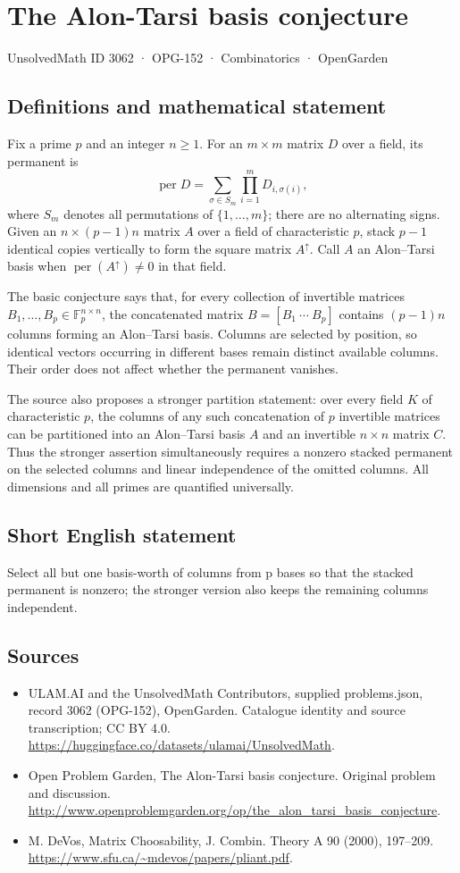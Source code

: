 \documentclass[11pt,a4paper]{article}
\begin{document}
\section*{The Alon-Tarsi basis conjecture}\label{3062}
{\small UnsolvedMath ID 3062 · OPG-152 · Combinatorics · OpenGarden}
\subsection{Definitions and mathematical statement}
Fix a prime $p$ and an integer $n\ge1$. For an $m\times m$ matrix $D$ over a field, its permanent is
\[
 \operatorname{per}D=\sum_{\sigma\in S_m}\prod_{i=1}^mD_{i,\sigma(i)},
\]
where $S_m$ denotes all permutations of $\{1,\ldots,m\}$; there are no alternating signs. Given an $n\times(p-1)n$ matrix $A$ over a field of characteristic $p$, stack $p-1$ identical copies vertically to form the square matrix $A^{\uparrow}$. Call $A$ an Alon--Tarsi basis when $\operatorname{per}(A^{\uparrow})\ne0$ in that field.

The basic conjecture says that, for every collection of invertible matrices $B_1,\ldots,B_p\in\mathbb F_p^{n\times n}$, the concatenated matrix $B=[B_1\ \cdots\ B_p]$ contains $(p-1)n$ columns forming an Alon--Tarsi basis. Columns are selected by position, so identical vectors occurring in different bases remain distinct available columns. Their order does not affect whether the permanent vanishes.

The source also proposes a stronger partition statement: over every field $K$ of characteristic $p$, the columns of any such concatenation of $p$ invertible matrices can be partitioned into an Alon--Tarsi basis $A$ and an invertible $n\times n$ matrix $C$. Thus the stronger assertion simultaneously requires a nonzero stacked permanent on the selected columns and linear independence of the omitted columns. All dimensions and all primes are quantified universally.
\subsection{Short English statement}
Select all but one basis-worth of columns from p bases so that the stacked permanent is nonzero; the stronger version also keeps the remaining columns independent.
\subsection{Sources}
\begin{itemize}
\item[S1] ULAM.AI and the UnsolvedMath Contributors, supplied problems.json, record 3062 (OPG-152), OpenGarden. Catalogue identity and source transcription; CC BY 4.0.
\url{https://huggingface.co/datasets/ulamai/UnsolvedMath}.
\item[S2] Open Problem Garden, The Alon-Tarsi basis conjecture. Original problem and discussion.
\url{http://www.openproblemgarden.org/op/the_alon_tarsi_basis_conjecture}.
\item[S3] M. DeVos, Matrix Choosability, J. Combin. Theory A 90 (2000), 197--209.
\url{https://www.sfu.ca/~mdevos/papers/pliant.pdf}.
\end{itemize}
\end{document}
